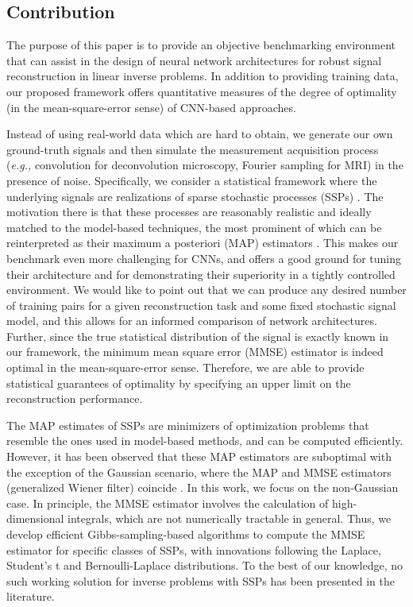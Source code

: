 \documentclass[journal]{IEEEtran}
\begin{document}
\subsection{Contribution}
The purpose of this paper is to provide an objective benchmarking environment
that can assist in the design of neural network architectures for robust signal reconstruction in linear inverse problems. In addition to providing training data, our proposed framework offers quantitative measures of the degree of optimality (in the mean-square-error sense) of CNN-based approaches.

Instead of using real-world data which are hard to obtain, we generate our own ground-truth signals and then simulate the measurement acquisition process (\textit{e.g.,} convolution for deconvolution microscopy, Fourier sampling for MRI) in the presence of noise. Specifically, we consider a statistical framework where the underlying signals are realizations of sparse stochastic processes (SSPs) \cite{unser2014ssp}. The motivation there is that these processes are reasonably realistic and ideally matched to the model-based techniques, the most prominent of which can be reinterpreted as their maximum a posteriori (MAP) estimators \cite{kamilov2012mmse}. This makes our benchmark even more challenging for CNNs, and offers a good ground for tuning their architecture and for demonstrating their superiority in a tightly controlled environment. We would like to point out that we can produce any desired number of training pairs for a given reconstruction task and some fixed stochastic signal model, and this allows for an informed comparison of network architectures. Further, since the true statistical distribution of the signal is exactly known in our framework, the minimum mean square error (MMSE) estimator is indeed optimal in the mean-square-error sense. Therefore, we are able to provide statistical guarantees of optimality by specifying an upper limit on the reconstruction performance.

The MAP estimates of SSPs are minimizers of optimization problems that resemble the ones used in model-based methods, and can be computed efficiently. However, it has been observed that these MAP estimators are suboptimal \cite{kamilov2012mmse,amini2012bayesian} with the exception of the Gaussian scenario, where the MAP and MMSE estimators (generalized Wiener filter) coincide \cite{kay1993fundamentals}. In this work, we focus on the non-Gaussian case. In principle, the MMSE estimator involves the calculation of high-dimensional integrals, which are not numerically tractable in general. Thus, we develop efficient Gibbs-sampling-based algorithms to compute the MMSE estimator for specific classes of SSPs, with innovations following the Laplace, Student's t and Bernoulli-Laplace distributions. To the best of our knowledge, no such working solution for inverse problems with SSPs has been presented in the literature.
\end{document}
